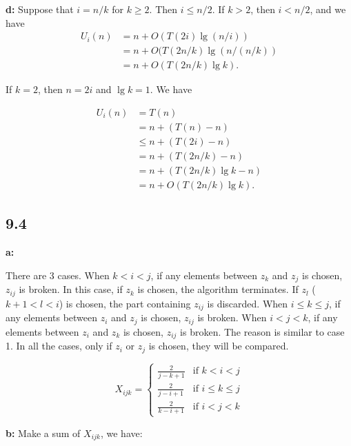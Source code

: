 \documentclass{book}
\begin{document}
\begin{CJK}{UTF8}{gkai}
\textbf{d:} Suppose that $i = n/k$ for $k \ge 2$. Then $i \le n/2$. If $k > 2$, 
then $i < n/2$, and we have
\begin{align*}
U_i(n) & = n + O(T(2i)\lg(n/i)) \\
& = n + O(T(2n/k)\lg(n/(n/k)) \\
& = n + O(T(2n/k)\lg k).
\end{align*}

If $k=2$, then $n = 2i$ and $\lg k = 1$. We have

\begin{align*}
U_i(n) & = T(n) \\
& = n + (T(n) - n) \\
& \le n + (T(2i) - n) \\
& = n + (T(2n/k) - n) \\
& = n + (T(2n/k)\lg k - n) \\
& = n + O(T(2n/k)\lg k).
\end{align*}

\subsection*{9.4}
\textbf{a:}

There are 3 cases.  When $k < i <j$, if any elements between $z_k$ and $z_j$ is 
chosen, $z_{ij}$ is broken. In this case, if $z_k$ is chosen, the algorithm 
terminates. If $z_l$ ($k+1 < l <i$) is chosen, the part containing $z_{ij}$ is 
discarded.  When $i \le k \le j$, if any elements between $z_i$ and $z_j$ is 
chosen, $z_{ij}$ is broken.  When $i < j < k$, if any elements between $z_i$ and 
$z_k$ is chosen, $z_{ij}$ is broken. The reason is similar to case 1. In all the 
cases, only if $z_i$ or $z_j$ is chosen, they will be compared.


\begin{equation*}
X_{ijk} = \left\{
\begin{array}{ll}
\frac{2}{j-k+1} & \mbox{if }k < i <j \\
\frac{2}{j-i+1}  & \mbox{if }i \le k \le j \\
\frac{2}{k-i+1} & \mbox{if } i < j < k
\end{array}
\right.
\end{equation*}

\textbf{b:}
Make a sum of $X_{ijk}$, we have:


\end{CJK}
\end{document}
